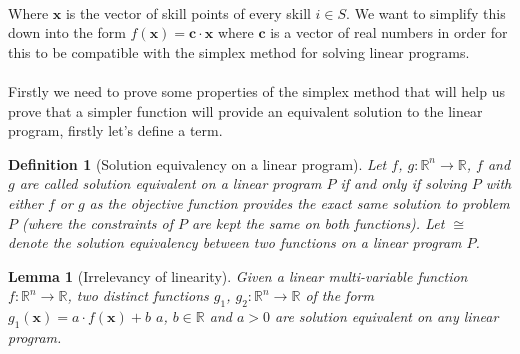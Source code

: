 \documentclass{article}
\newtheorem{definition}{Definition}[section]
\newtheorem{lemma}{Lemma}[section]
\begin{document}
\paragraph{}Where $\boldsymbol{x}$ is the vector of skill points of every skill $i \in S$. We want to simplify this down into the form $f(\boldsymbol{x})=\boldsymbol{c} \cdot \boldsymbol{x}$ where $\boldsymbol{c}$ is a vector of real numbers in order for this to be compatible with the simplex method for solving linear programs.

\paragraph{}Firstly we need to prove some properties of the simplex method that will help us prove that a simpler function will provide an equivalent solution to the linear program, firstly let's define a term.

\begin{definition}[Solution equivalency on a linear program] Let $f$, $g : \mathbb{R}^n \rightarrow \mathbb{R}$, $f$ and $g$ are called solution equivalent on a linear program $P$ if and only if solving $P$ with either $f$ or $g$ as the objective function provides the exact same solution to problem $P$ (where the constraints of $P$ are kept the same on both functions).
Let $\cong$ denote the solution equivalency between two functions on a linear program $P$.
\end{definition}


\begin{lemma}[Irrelevancy of linearity]
\label{ref:lemma_linearity}
Given a linear multi-variable function $f:\mathbb{R}^n\rightarrow\mathbb{R}$, two distinct functions $g_1$, $g_2 : \mathbb{R}^n\rightarrow\mathbb{R}$ of the form $g_1(\boldsymbol{x}) = a\cdot f(\boldsymbol{x}) + b$ $a$, $b \in \mathbb{R}$ and $a > 0$ are solution equivalent on any linear program.
\end{lemma}
\end{document}
